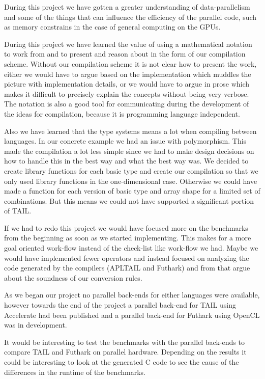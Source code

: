\documentclass[11pt]{article}
\begin{document}
During this project we have gotten a greater understanding of data-parallelism and some of the things that can influence the efficiency of the parallel code, such as memory constrains in the case of general computing on the GPUs. 

During this project we have learned the value of using a mathematical notation to work from and to present and reason about in the form of our compilation scheme. 
Without our compilation scheme it is not clear how to present the work, either we would have to argue based on the
implementation which muddles the picture with implementation details, or we would have to argue in prose which
makes it difficult to precisely explain the concepts without being very verbose.
The notation is also a good tool for communicating during the development of the ideas for compilation, because it is programming language independent.

Also we have learned that the type systems means a lot when compiling between languages. 
In our concrete example we had an issue with polymorphism.
This made the compilation a lot less simple since we had to make design decisions on how to handle this in the best way and what the best way was. 
We decided to create library functions for each basic type and create our compilation so that we only used library functions in the one-dimensional case.
Otherwise we could have made a function for each version of basic type and array shape for a limited set of combinations.
But this means we could not have supported a significant portion of TAIL.

If we had to redo this project we would have focused more on the benchmarks from the beginning as soon as we
started implementing. This makes for a more goal oriented work-flow instead of the check-list like work-flow we had.
Maybe we would have implemented fewer operators and instead focused on analyzing the code generated by the compilers (APLTAIL and Futhark) and
from that argue about the soundness of our conversion rules.

As we began our project no parallel back-ends for either languages were available, however towards the end of the project a
parallel back-end for TAIL using Accelerate had been published \cite{Array:2015} and a parallel back-end for Futhark using OpenCL
was in development.

It would be interesting to test the benchmarks with the parallel back-ends to compare TAIL and Futhark on parallel hardware.
Depending on the results it could be interesting to look at the generated C code to see the cause of the differences in the
runtime of the benchmarks.
\end{document}
